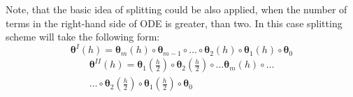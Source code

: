\documentclass{article}
\newcommand{\vect}[1]{\boldsymbol{\mathbf{#1}}}
\begin{document}
Note, that the basic idea of splitting could be also applied, when the number of terms in the right-hand side of ODE is greater, than two. In this case splitting scheme will take the following form:
\begin{equation}\label{strang:marchuk}
	\vect{\theta}^I(h) = \vect{\theta}_m(h) \circ \vect{\theta}_{m-1} \circ \ldots \circ \vect{\theta}_2(h) \circ \vect{\theta}_1(h) \circ \vect{\theta}_0
\end{equation}
\begin{equation}\label{strang:strang}
\begin{split}
	\vect{\theta}^{II}(h) = \vect{\theta}_1\left(\frac{h}{2}\right) \circ \vect{\theta}_2\left(\frac{h}{2}\right) \circ\ldots \vect{\theta}_m(h) \circ \ldots \\ \ldots \circ \vect{\theta}_2\left(\frac{h}{2}\right)  \circ \vect{\theta}_1\left(\frac{h}{2}\right) \circ \vect{\theta}_0
\end{split}
\end{equation}
\end{document}
